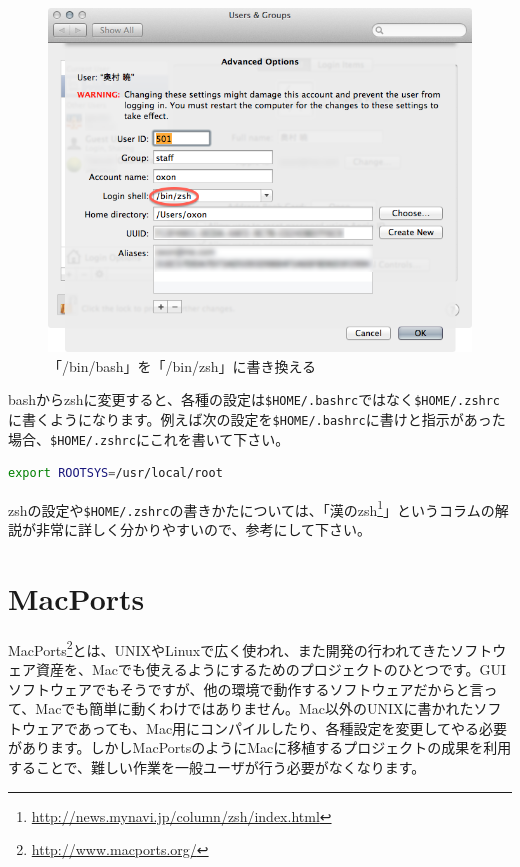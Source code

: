 \begin{figure}
  \begin{center}
    \includegraphics[scale=0.35,bb= 0 0 668 542]{fig/zsh2.png}
    \caption{「/bin/bash」を「/bin/zsh」に書き換える}
    \label{fig_zsh2_png}
  \end{center}
\end{figure}

bashからzshに変更すると、各種の設定は\texttt{\$HOME/.bashrc}ではなく\texttt{\$HOME/.zshrc}に書くようになります。例えば次の設定を\texttt{\$HOME/.bashrc}に書けと指示があった場合、\texttt{\$HOME/.zshrc}にこれを書いて下さい。

\begin{lstlisting}[language=bash]
export ROOTSYS=/usr/local/root
\end{lstlisting}

zshの設定や\texttt{\$HOME/.zshrc}の書きかたについては、「漢のzsh\footnote{\url{http://news.mynavi.jp/column/zsh/index.html}}」というコラムの解説が非常に詳しく分かりやすいので、参考にして下さい。

\section{MacPorts}
\label{sec_MacPorts}
MacPorts\footnote{\url{http://www.macports.org/}}とは、UNIXやLinuxで広く使われ、また開発の行われてきたソフトウェア資産を、Macでも使えるようにするためのプロジェクトのひとつです。GUIソフトウェアでもそうですが、他の環境で動作するソフトウェアだからと言って、Macでも簡単に動くわけではありません。Mac以外のUNIXに書かれたソフトウェアであっても、Mac用にコンパイルしたり、各種設定を変更してやる必要があります。しかしMacPortsのようにMacに移植するプロジェクトの成果を利用することで、難しい作業を一般ユーザが行う必要がなくなります。

